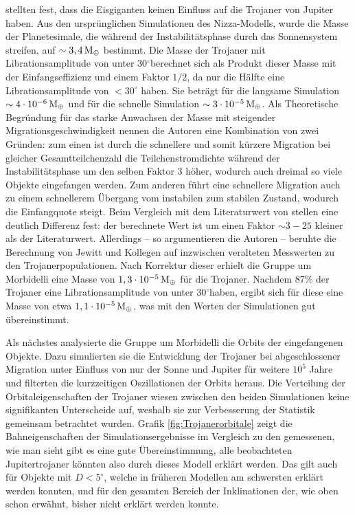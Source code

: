 \documentclass[12pt,a4paper,twoside]{article}
\renewcommand{\cite}{\citep}
\newcommand{\degree}{$^\circ$}
\newcommand{\ME}{M_\oplus}
\begin{document}
\cite{Morbidelli2005} stellten fest, dass die Eisgiganten keinen Einfluss auf die Trojaner von Jupiter haben.
Aus den ursprünglichen Simulationen des Nizza-Modells, %
wurde die Masse der Planetesimale, die während der Instabilitätsphase durch das Sonnensystem streifen, auf $\sim \unit[3,4]{\ME}$ bestimmt.
Die Masse der Trojaner mit Librationsamplitude von unter 30\degree berechnet sich als Produkt dieser Masse mit der Einfangseffizienz und einem Faktor $1/2$, da nur die Hälfte eine Librationsamplitude von $<30^\circ$ haben. Sie beträgt für die langsame Simulation $\sim\unit[4\cdot 10^{-6}]{\ME}$ und für die schnelle Simulation $\sim \unit[3\cdot 10^{-5}]{\ME}$.
Als Theoretische Begründung für das starke Anwachsen der Masse mit steigender Migrationsgeschwindigkeit nennen die Autoren eine Kombination von zwei Gründen:
zum einen ist durch die schnellere und somit kürzere Migration bei gleicher Gesamt\/teilchenzahl die Teilchenstromdichte während der Instabilitätsphase um den selben Faktor 3 höher, wodurch auch dreimal so viele Objekte eingefangen werden. Zum anderen führt eine schnellere Migration auch zu einem schnellerem Übergang vom instabilen zum stabilen Zustand, wodurch die Einfangquote steigt\cite{Morbidelli2005}.
Beim Vergleich mit dem Literaturwert von \cite{Jewitt2000} stellen \cite{Morbidelli2005} eine deutlich Differenz fest: der berechnete Wert ist um einen Faktor $\sim 3-25$ kleiner als der Literaturwert.
Allerdings – so argumentieren die Autoren – beruhte die Berechnung von Jewitt und Kollegen auf inzwischen veralteten Messwerten zu den Trojanerpopulationen. %
Nach Korrektur dieser erhielt die Gruppe um Morbidelli eine Masse von $\unit[1,3 \cdot 10^{-5}]{\ME}$ für die Trojaner. Nachdem 87\% der Trojaner eine Librationsamplitude von unter 30\degree haben, ergibt sich für diese eine Masse von etwa $\unit[1,1 \cdot 10^{-5}]{\ME}$, was mit den Werten der Simulationen gut übereinstimmt\cite{Morbidelli2005}.

Als nächstes analysierte die Gruppe um Morbidelli die Orbits der eingefangenen Objekte. Dazu simulierten sie die Entwicklung der Trojaner bei abgeschlossener Migration unter Einfluss von nur der Sonne und Jupiter für weitere $10^5$ Jahre und filterten die kurzzeitigen Oszillationen der Orbits heraus.
Die Verteilung der Orbitaleigenschaften der Trojaner wiesen zwischen den beiden Simulationen keine signifikanten Unterscheide auf, weshalb sie zur Verbesserung der Statistik gemeinsam betrachtet wurden.
Grafik \ref{fig:Trojanerorbitale} zeigt die Bahneigenschaften der Simulationsergebnisse im Vergleich zu den gemessenen, wie man sieht gibt es eine gute Übereinstimmung, alle beobachteten Jupitertrojaner könnten also durch dieses Modell erklärt werden.
Das gilt auch für Objekte mit $D<5^\circ$, welche in früheren Modellen am schwersten erklärt werden konnten\cite{Morbidelli2005}, %
und für den gesamten Bereich der Inklinationen der, wie oben schon erwähnt, bisher nicht erklärt werden konnte.
\end{document}
